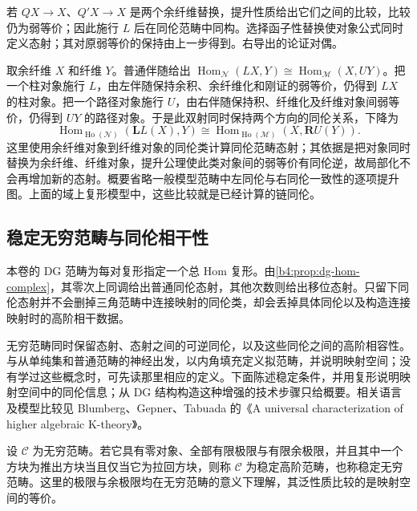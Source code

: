 \begin{proofsketch}
	若 \(QX\to X\)、\(Q'X\to X\) 是两个余纤维替换，提升性质给出它们之间的比较，比较仍为弱等价；因此施行 \(L\) 后在同伦范畴中同构。选择函子性替换使对象公式同时定义态射；其对原弱等价的保持由上一步得到。右导出的论证对偶。

	取余纤维 \(X\) 和纤维 \(Y\)。普通伴随给出 \(\operatorname{Hom}_{\mathcal N}(LX,Y)\cong\operatorname{Hom}_{\mathcal M}(X,UY)\)。把一个柱对象施行 \(L\)，由左伴随保持余积、余纤维化和刚证的弱等价，仍得到 \(LX\) 的柱对象。把一个路径对象施行 \(U\)，由右伴随保持积、纤维化及纤维对象间弱等价，仍得到 \(UY\) 的路径对象。于是此双射同时保持两个方向的同伦关系，下降为
	\[
		\operatorname{Hom}_{\operatorname{Ho}(\mathcal N)}(\mathbf LL(X),Y) \cong\operatorname{Hom}_{\operatorname{Ho}(\mathcal M)}(X,\mathbf RU(Y)).
	\]
	这里使用余纤维对象到纤维对象的同伦类计算同伦范畴态射；其依据是把对象同时替换为余纤维、纤维对象，提升公理使此类对象间的弱等价有同伦逆，故局部化不会再增加新的态射。概要省略一般模型范畴中左同伦与右同伦一致性的逐项提升图。上面的域上复形模型中，这些比较就是已经计算的链同伦。
\end{proofsketch}

\subsection{稳定无穷范畴与同伦相干性}
\label{b4:subsec:B04:02}

本卷的 DG 范畴为每对复形指定一个总 Hom 复形。由\cref{b4:prop:dg-hom-complex}，其零次上同调给出普通同伦态射，其他次数则给出移位态射。只留下同伦态射并不会删掉三角范畴中连接映射的同伦类，却会丢掉具体同伦以及构造连接映射时的高阶相干数据。

\ProseParagraphBreak
无穷范畴同时保留态射、态射之间的可逆同伦，以及这些同伦之间的高阶相容性。与从单纯集和普通范畴的神经出发，以内角填充定义拟范畴，并说明映射空间；没有学过这些概念时，可先读那里相应的定义。下面陈述稳定条件，并用复形说明映射空间中的同伦信息；从 DG 结构构造这种增强的技术步骤只给概要。相关语言及模型比较见 Blumberg、Gepner、Tabuada 的《A universal characterization of higher algebraic K-theory》\cite[Section 2.2, pp. 747--750]{BlumbergGepnerTabuada2013UniversalKTheory}。

\begin{definition}\label{b4:def:B-stable-infinity}
	设 \(\mathcal C\) 为无穷范畴。若它具有零对象、全部有限极限与有限余极限，并且其中一个方块为推出方块当且仅当它为拉回方块，则称 \(\mathcal C\) 为稳定高阶范畴，也称稳定无穷范畴。这里的极限与余极限均在无穷范畴的意义下理解，其泛性质比较的是映射空间的等价。
\end{definition}

